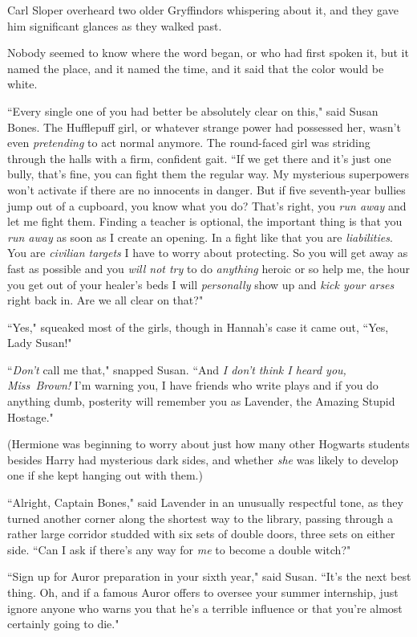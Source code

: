 Carl Sloper overheard two older Gryffindors whispering about it, and they gave him significant glances as they walked past.

Nobody seemed to know where the word began, or who had first spoken it, but it named the place, and it named the time, and it said that the color would be white.

\later

``Every single one of you had better be absolutely clear on this," said Susan Bones. The Hufflepuff girl, or whatever strange power had possessed her, wasn't even \emph{pretending} to act normal anymore. The round-faced girl was striding through the halls with a firm, confident gait. ``If we get there and it's just one bully, that's fine, you can fight them the regular way. My mysterious superpowers won't activate if there are no innocents in danger. But if five seventh-year bullies jump out of a cupboard, you know what you do? That's right, you \emph{run away} and let me fight them. Finding a teacher is optional, the important thing is that you \emph{run away} as soon as I create an opening. In a fight like that you are \emph{liabilities}. You are \emph{civilian targets} I have to worry about protecting. So you will get away as fast as possible and you \emph{will not try} to do \emph{anything} heroic or so help me, the hour you get out of your healer's beds I will \emph{personally} show up and \emph{kick your arses} right back in. Are we all clear on that?"

``Yes," squeaked most of the girls, though in Hannah's case it came out, ``Yes, Lady Susan!"

``\emph{Don't} call me that," snapped Susan. ``And \emph{I don't think I heard you, Miss~Brown!} I'm warning you, I have friends who write plays and if you do anything dumb, posterity will remember you as Lavender, the Amazing Stupid Hostage."

(Hermione was beginning to worry about just how many other Hogwarts students besides Harry had mysterious dark sides, and whether \emph{she} was likely to develop one if she kept hanging out with them.)

``Alright, Captain Bones," said Lavender in an unusually respectful tone, as they turned another corner along the shortest way to the library, passing through a rather large corridor studded with six sets of double doors, three sets on either side. ``Can I ask if there's any way for \emph{me} to become a double witch?"

``Sign up for Auror preparation in your sixth year," said Susan. ``It's the next best thing. Oh, and if a famous Auror offers to oversee your summer internship, just ignore anyone who warns you that he's a terrible influence or that you're almost certainly going to die."

